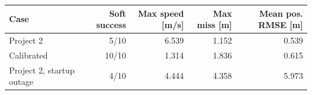 \begin{tabularx}{\textwidth}{Yrrrr}\toprule
Case & Soft success & Max speed [m/s] & Max miss [m] & Mean pos. RMSE [m]\\\midrule
Project 2 & 5/10 & 6.539 & 1.152 & 0.539\\
Calibrated & 10/10 & 1.314 & 1.836 & 0.615\\
Project 2, startup outage & 4/10 & 4.444 & 4.358 & 5.973\\
\bottomrule\end{tabularx}
